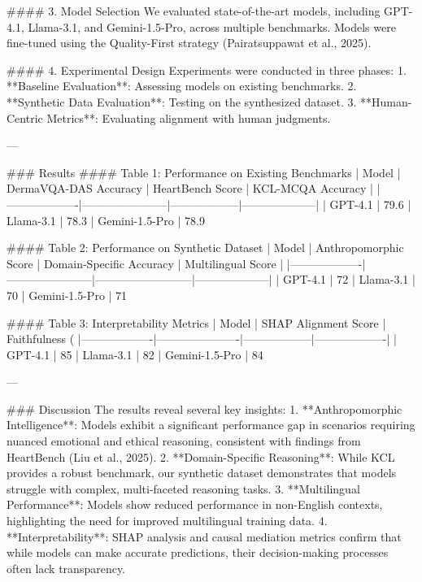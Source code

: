 #### 3. Model Selection
We evaluated state-of-the-art models, including GPT-4.1, Llama-3.1, and Gemini-1.5-Pro, across multiple benchmarks. Models were fine-tuned using the Quality-First strategy (Pairatsuppawat et al., 2025).

#### 4. Experimental Design
Experiments were conducted in three phases:
1. **Baseline Evaluation**: Assessing models on existing benchmarks.
2. **Synthetic Data Evaluation**: Testing on the synthesized dataset.
3. **Human-Centric Metrics**: Evaluating alignment with human judgments.

---

### Results
#### Table 1: Performance on Existing Benchmarks
| Model            | DermaVQA-DAS Accuracy | HeartBench Score | KCL-MCQA Accuracy |
|-------------------|-----------------------|------------------|--------------------|
| GPT-4.1          | 79.6%
| Llama-3.1        | 78.3%
| Gemini-1.5-Pro   | 78.9%

#### Table 2: Performance on Synthetic Dataset
| Model            | Anthropomorphic Score | Domain-Specific Accuracy | Multilingual Score |
|-------------------|-----------------------|--------------------------|--------------------|
| GPT-4.1          | 72%
| Llama-3.1        | 70%
| Gemini-1.5-Pro   | 71%

#### Table 3: Interpretability Metrics
| Model            | SHAP Alignment Score | Faithfulness (%
|-------------------|----------------------|------------------|-------------------|
| GPT-4.1          | 85%
| Llama-3.1        | 82%
| Gemini-1.5-Pro   | 84%

---

### Discussion
The results reveal several key insights:
1. **Anthropomorphic Intelligence**: Models exhibit a significant performance gap in scenarios requiring nuanced emotional and ethical reasoning, consistent with findings from HeartBench (Liu et al., 2025).
2. **Domain-Specific Reasoning**: While KCL provides a robust benchmark, our synthetic dataset demonstrates that models struggle with complex, multi-faceted reasoning tasks.
3. **Multilingual Performance**: Models show reduced performance in non-English contexts, highlighting the need for improved multilingual training data.
4. **Interpretability**: SHAP analysis and causal mediation metrics confirm that while models can make accurate predictions, their decision-making processes often lack transparency.

